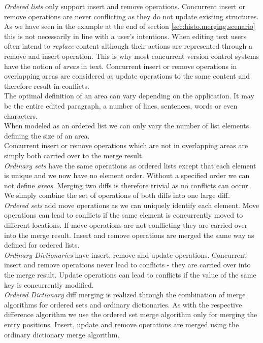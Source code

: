 \emph{Ordered lists} only support insert and remove operations.
Concurrent insert or remove operations are never conflicting as they do not update existing structures.
As we have seen in the example at the end of section \ref{sec:histo.merging.scenario} this is not necessarily in line with a user's intentions.
When editing text users often intend to \emph{replace} content although their actions are represented through a remove and insert operation.
This is why most concurrent version control systems have the notion of \emph{areas} in text.
Concurrent insert or remove operations in overlapping areas are considered as update operations to the same content and therefore result in conflicts.\\
The optimal definition of an area can vary depending on the application.
It may be the entire edited paragraph, a number of lines, sentences, words or even characters.\\
When modeled as an ordered list we can only vary the number of list elements defining the size of an area.\\
Concurrent insert or remove operations which are not in overlapping areas are simply both carried over to the merge result.\\

\emph{Ordinary sets} have the same operations as ordered lists except that each element is unique and we now have no element order.
Without a specified order we can not define \emph{areas}.
Merging two diffs is therefore trivial as no conflicts can occur.
We simply combine the set of operations of both diffs into one large diff.\\

\emph{Ordered sets} add move operations as we can uniquely identify each element.
Move operations can lead to conflicts if the same element is concurrently moved to different locations.
If move operations are not conflicting they are carried over into the merge result.
Insert and remove operations are merged the same way as defined for ordered lists.\\

\emph{Ordinary Dictionaries} have insert, remove and update operations.
Concurrent insert and remove operations never lead to conflicts - they are carried over into the merge result.
Update operations can lead to conflicts if the value of the same key is concurrently modified.\\

\emph{Ordered Dictionary} diff merging is realized through the combination of merge algorithms for ordered sets and ordinary dictionaries.
As with the respective difference algorithm we use the ordered set merge algorithm only for merging the entry positions.
Insert, update and remove operations are merged using the ordinary dictionary merge algorithm.

